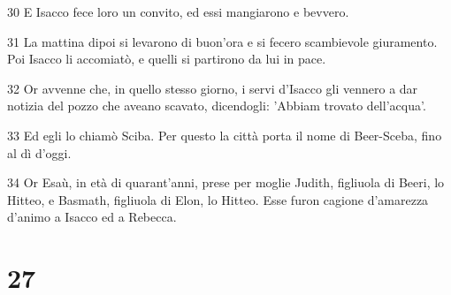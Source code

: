 \par 30 E Isacco fece loro un convito, ed essi mangiarono e bevvero.
\par 31 La mattina dipoi si levarono di buon'ora e si fecero scambievole giuramento. Poi Isacco li accomiatò, e quelli si partirono da lui in pace.
\par 32 Or avvenne che, in quello stesso giorno, i servi d'Isacco gli vennero a dar notizia del pozzo che aveano scavato, dicendogli: 'Abbiam trovato dell'acqua'.
\par 33 Ed egli lo chiamò Sciba. Per questo la città porta il nome di Beer-Sceba, fino al dì d'oggi.
\par 34 Or Esaù, in età di quarant'anni, prese per moglie Judith, figliuola di Beeri, lo Hitteo, e Basmath, figliuola di Elon, lo Hitteo. Esse furon cagione d'amarezza d'animo a Isacco ed a Rebecca.

\chapter{27}

